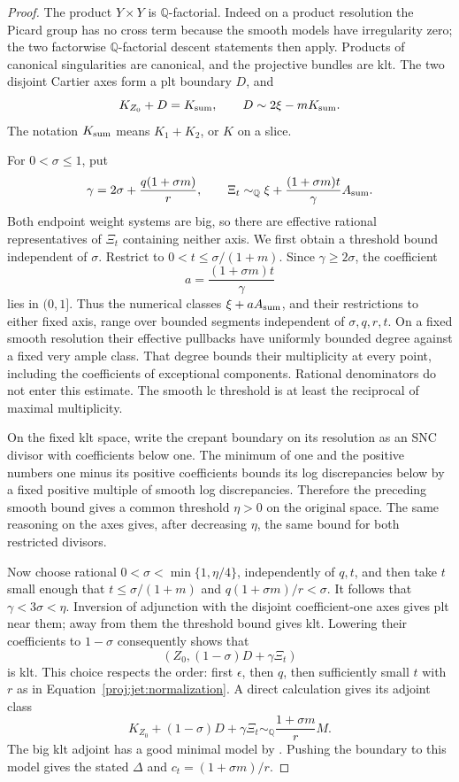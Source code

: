 \documentclass[11pt,letterpaper]{article}
\newcommand{\Q}{\mathbb{Q}}
\theoremstyle{definition}
\theoremstyle{remark}
\begin{document}
\begin{proof}
The product \(Y\times Y\) is \(\Q\)-factorial.  Indeed on a product
resolution the Picard group has no cross term because the smooth
models have irregularity zero; the two factorwise
\(\Q\)-factorial descent statements then apply.  Products of
canonical singularities are canonical, and the projective bundles
are klt.  The two disjoint Cartier axes form a plt boundary \(D\),
and
\[
 K_{Z_0}+D=K_{\rm sum},\qquad
 D\sim2\xi-mK_{\rm sum}.
\]
The notation \(K_{\rm sum}\) means \(K_1+K_2\), or \(K\) on a slice.

For \(0<\sigma\le1\), put
\[
 \gamma=2\sigma+\frac{q(1+\sigma m)}r,\qquad
 \Xi_t\sim_{\Q}\xi+
       \frac{(1+\sigma m)t}{\gamma}A_{\rm sum}.
\]
Both endpoint weight systems are big, so there are effective
rational representatives of \(\Xi_t\) containing neither axis.
We first obtain a threshold bound independent of \(\sigma\).
Restrict to \(0<t\le\sigma/(1+m)\).  Since \(\gamma\ge2\sigma\),
the coefficient
\[
 a=\frac{(1+\sigma m)t}{\gamma}
\]
lies in \((0,1]\).  Thus the numerical classes
\(\xi+aA_{\rm sum}\), and their restrictions to either fixed axis,
range over bounded segments independent of \(\sigma,q,r,t\).
On a fixed smooth resolution their effective pullbacks have
uniformly bounded degree against a fixed very ample class.
That degree bounds their multiplicity at every point, including
the coefficients of exceptional components.  Rational denominators
do not enter this estimate.  The smooth lc threshold is at least
the reciprocal of maximal multiplicity.

On the fixed klt space, write the crepant boundary on its resolution
as an SNC divisor with coefficients below one.  The minimum of
one and the positive numbers one minus its positive coefficients
bounds its log discrepancies below by a fixed positive multiple
of smooth log discrepancies.  Therefore the preceding smooth
bound gives a common threshold \(\eta>0\) on the original space.
The same reasoning on the axes gives, after decreasing \(\eta\),
the same bound for both restricted divisors.

Now choose rational \(0<\sigma<\min\{1,\eta/4\}\), independently of
\(q,t\), and then take \(t\) small enough that
\(t\le\sigma/(1+m)\) and \(q(1+\sigma m)/r<\sigma\).
It follows that \(\gamma<3\sigma<\eta\).
Inversion of adjunction with the disjoint coefficient-one axes
gives plt near them; away from them the threshold bound gives klt.
Lowering their coefficients to \(1-\sigma\) consequently shows that
\[
 (Z_0,(1-\sigma)D+\gamma\Xi_t)
\]
is klt.  This choice respects the order: first \(\epsilon\), then
\(q\), then sufficiently small \(t\) with \(r\) as in
Equation~\eqref{proj:jet:normalization}.
A direct calculation gives its adjoint class
\[
 K_{Z_0}+(1-\sigma)D+\gamma\Xi_t
   \sim_{\Q}\frac{1+\sigma m}{r}M.
\]
The big klt adjoint has a good minimal model by
\cite{BCHM}.  Pushing the boundary to this model gives the stated
\(\Delta\) and \(c_t=(1+\sigma m)/r\).


\end{proof}
\end{document}
